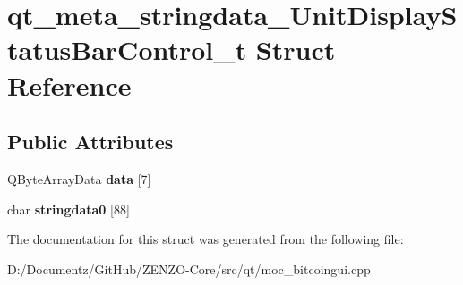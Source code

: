 \hypertarget{structqt__meta__stringdata___unit_display_status_bar_control__t}{}\section{qt\+\_\+meta\+\_\+stringdata\+\_\+\+Unit\+Display\+Status\+Bar\+Control\+\_\+t Struct Reference}
\label{structqt__meta__stringdata___unit_display_status_bar_control__t}
\subsection*{Public Attributes}
\begin{DoxyCompactItemize}
\item 
\mbox{\label{structqt__meta__stringdata___unit_display_status_bar_control__t_ae2287dcfd5cb377cf97361f287b52fde}} 
Q\+Byte\+Array\+Data {\bfseries data} \mbox{[}7\mbox{]}
\item 
\mbox{\label{structqt__meta__stringdata___unit_display_status_bar_control__t_a02abce1d77d4f75d735c842bfd2b6e7d}} 
char {\bfseries stringdata0} \mbox{[}88\mbox{]}
\end{DoxyCompactItemize}


The documentation for this struct was generated from the following file\+:\begin{DoxyCompactItemize}
\item 
D\+:/\+Documentz/\+Git\+Hub/\+Z\+E\+N\+Z\+O-\/\+Core/src/qt/moc\+\_\+bitcoingui.\+cpp\end{DoxyCompactItemize}
